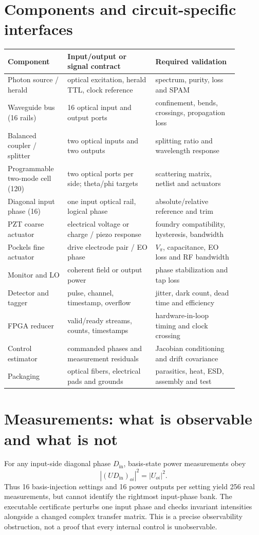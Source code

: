 \documentclass[10pt]{article}
\begin{document}
\section{Components and circuit-specific interfaces}
\begin{longtable}{p{0.23\linewidth}p{0.34\linewidth}p{0.32\linewidth}}
\toprule Component & Input/output or signal contract & Required validation\\\midrule
Photon source / herald & optical excitation, herald TTL, clock reference & spectrum, purity, loss and SPAM\\
Waveguide bus (16 rails) & 16 optical input and output ports & confinement, bends, crossings, propagation loss\\
Balanced coupler / splitter & two optical inputs and two outputs & splitting ratio and wavelength response\\
Programmable two-mode cell (120) & two optical ports per side; theta/phi targets & scattering matrix, netlist and actuators\\
Diagonal input phase (16) & one input optical rail, logical phase & absolute/relative reference and trim\\
PZT coarse actuator & electrical voltage or charge / piezo response & foundry compatibility, hysteresis, bandwidth\\
Pockels fine actuator & drive electrode pair / EO phase & $V_\pi$, capacitance, EO loss and RF bandwidth\\
Monitor and LO & coherent field or output power & phase stabilization and tap loss\\
Detector and tagger & pulse, channel, timestamp, overflow & jitter, dark count, dead time and efficiency\\
FPGA reducer & valid/ready streams, counts, timestamps & hardware-in-loop timing and clock crossing\\
Control estimator & commanded phases and measurement residuals & Jacobian conditioning and drift covariance\\
Packaging & optical fibers, electrical pads and grounds & parasitics, heat, ESD, assembly and test\\\bottomrule
\end{longtable}

\section{Measurements: what is observable and what is not}
For any input-side diagonal phase $D_{\mathrm{in}}$, basis-state power measurements obey
\[
|(U D_{\mathrm{in}})_{oi}|^2=|U_{oi}|^2.
\]
Thus 16 basis-injection settings and 16 power outputs per setting yield 256 real measurements, but cannot identify the rightmost input-phase bank. The executable certificate perturbs one input phase and checks invariant intensities alongside a changed complex transfer matrix. This is a precise observability obstruction, not a proof that every internal control is unobservable.
\end{document}
